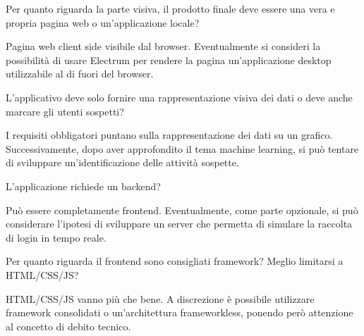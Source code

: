 \begin{spacing}{3}
\end{spacing}

\begin{minipage}[c]{0.47\textwidth}
\centering
Per quanto riguarda la parte visiva, il prodotto finale deve essere una vera e propria pagina web o un’applicazione locale?
\end{minipage}
\hfill
\begin{minipage}[c]{0.47\textwidth}
\centering
Pagina web client side visibile dal browser. Eventualmente si consideri la possibilità di usare Electrum per rendere la pagina un’applicazione desktop utilizzabile al di fuori del browser.
\end{minipage}

\begin{spacing}{3}
\end{spacing}

\begin{minipage}[c]{0.47\textwidth}
\centering
L’applicativo deve solo fornire una rappresentazione visiva dei dati o deve anche marcare gli utenti sospetti?
\end{minipage}
\hfill
\begin{minipage}[c]{0.47\textwidth}
\centering
I requisiti obbligatori puntano sulla rappresentazione dei dati su un grafico. Successivamente, dopo aver approfondito il tema machine learning, si può tentare di sviluppare un’identificazione delle attività sospette.
\end{minipage}

\begin{spacing}{3}
\end{spacing}

\begin{minipage}[c]{0.47\textwidth}
\centering
L’applicazione richiede un backend?
\end{minipage}
\hfill
\begin{minipage}[c]{0.47\textwidth}
\centering
Può essere completamente frontend. Eventualmente, come parte opzionale, si può considerare l’ipotesi di sviluppare un server che permetta di simulare la raccolta di login in tempo reale.
\end{minipage}

\begin{spacing}{3}
\end{spacing}

\begin{minipage}[c]{0.47\textwidth}
\centering
Per quanto riguarda il frontend sono consigliati framework? Meglio limitarsi a HTML/CSS/JS?
\end{minipage}
\hfill
\begin{minipage}[c]{0.47\textwidth}
\centering
HTML/CSS/JS vanno più che bene. A discrezione è possibile utilizzare framework consolidati o un’architettura frameworkless, ponendo però attenzione al concetto di debito tecnico.
\end{minipage}

